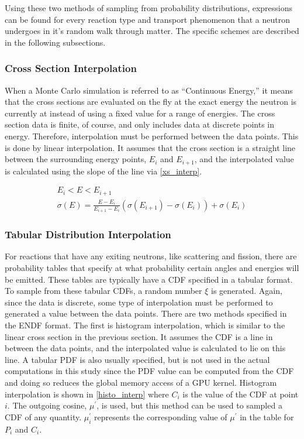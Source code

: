 Using these two methods of sampling from probability distributions, expressions can be found for every reaction type and transport phenomenon that a neutron undergoes in it's random walk through matter.  The specific schemes are described in the following subsections.

\subsubsection{Cross Section Interpolation}

When a Monte Carlo simulation is referred to as ``Continuous Energy,'' it means that the cross sections are evaluated on the fly at the exact energy the neutron is currently at instead of using a fixed value for a range of energies.  The cross section data is finite, of course, and only includes data at discrete points in energy.  Therefore, interpolation must be performed between the data points.  This is done by linear interpolation.  It assumes that the cross section is a straight line between the surrounding energy points, $E_i$ and $E_{i+1}$, and the interpolated value is calculated using the slope of the line via \eqref{xs_interp}.

 \begin{equation}
\label{xs_interp}
\begin{gathered}
E_i < E < E_{i+1} \\
\sigma(E) = \frac{E-E_i}{E_{i+1}-E_i}(\sigma(E_{i+1})-\sigma(E_i)) + \sigma(E_i)
\end{gathered}
\end{equation}

\subsubsection{Tabular Distribution Interpolation}

For reactions that have any exiting neutrons, like scattering and fission, there are probability tables that specify at what probability certain angles and energies will be emitted.  These tables are typically have a CDF specified in a tabular format.  To sample from these tabular CDFs, a random number $\xi$ is generated.  Again, since the data is discrete, some type of interpolation must be performed to generated a value between the data points.  There are two methods specified in the ENDF format.  The first is histogram interpolation, which is similar to the linear cross section in the previous section.  It assumes the CDF is a line in between the data points, and the interpolated value is calculated to lie on this line.  A tabular PDF is also usually specified, but is not used in the actual computations in this study since the PDF value can be computed from the CDF and doing so reduces the global memory access of a GPU kernel.  Histogram interpolation is shown in \eqref{histo_interp} where $C_{i}$ is the value of the CDF at point $i$.  The outgoing cosine, $\mu^\prime$, is used, but this method can be used to sampled a CDF of any quantity.  $\mu^\prime_i$ represents the corresponding value of $\mu^\prime$ in the table for $P_i$ and $C_i$.

